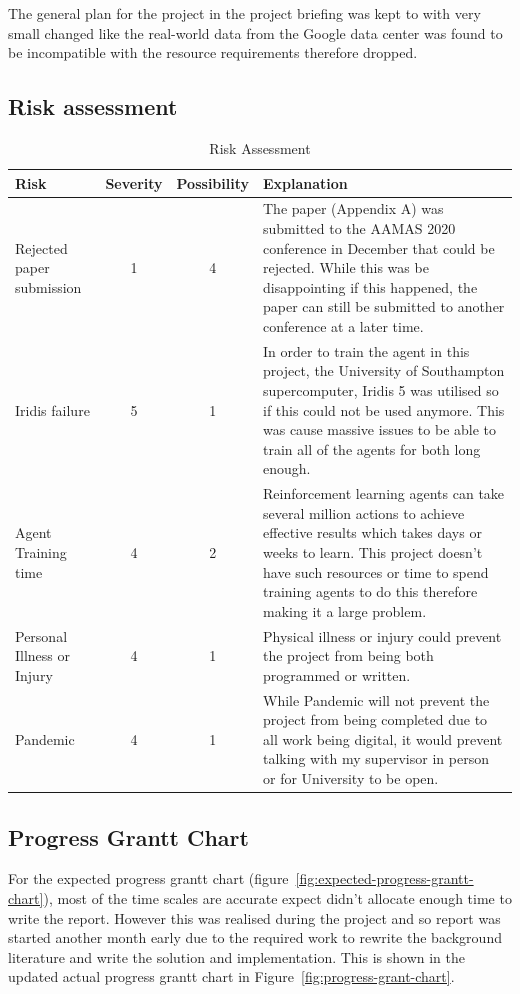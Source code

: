 The general plan for the project in the project briefing was kept to with very small changed like the real-world data
from the Google data center was found to be incompatible with the resource requirements therefore dropped.

\subsection*{Risk assessment}
\begin{table}[H]
    \centering
    \begin{tabular}{|p{3cm}|c|c|p{7cm}|} \hline
        \textbf{Risk}  & \textbf{Severity} & \textbf{Possibility} & \textbf{Explanation} \\ \hline
        Rejected paper submission & 1 & 4 & The paper (Appendix A) was submitted to the AAMAS 2020 conference in
            December that could be rejected. While this was be disappointing if this happened, the paper can still be
            submitted to another conference at a later time. \\ \hline
        Iridis failure & 5 & 1 & In order to train the agent in this project, the University of Southampton supercomputer,
            Iridis 5 was utilised so if this could not be used anymore. This was cause massive issues to be able to
            train all of the agents for both long enough. \\ \hline
        Agent Training time & 4 & 2 & Reinforcement learning agents can take several million actions to achieve
            effective results which takes days or weeks to learn. This project doesn't have such resources or time to
            spend training agents to do this therefore making it a large problem. \\ \hline
        Personal Illness or Injury & 4 & 1 & Physical illness or injury could prevent the project from being both
            programmed or written. \\ \hline
        Pandemic & 4 & 1 & While Pandemic will not prevent the project from being completed due to all work being
            digital, it would prevent talking with my supervisor in person or for University to be open. \\ \hline
    \end{tabular}
    \caption{Risk Assessment}
    \label{tab:risk_assessment}
\end{table}

\subsection*{Progress Grantt Chart}
For the expected progress grantt chart (figure~\ref{fig:expected-progress-grantt-chart}), most of the time scales are
accurate expect didn't allocate enough time to write the report. However this was realised during the project and so
report was started another month early due to the required work to rewrite the background literature and write the
solution and implementation. This is shown in the updated actual progress grantt chart in
Figure~\ref{fig:progress-grant-chart}.

